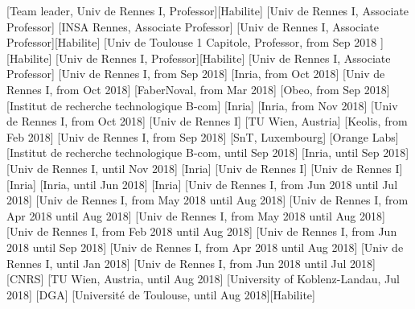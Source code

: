 \documentclass{ra2018}
\begin{document}
[Team leader, Univ de Rennes I, Professor][Habilite]
[Univ de Rennes I, Associate Professor]
[INSA Rennes, Associate Professor]
[Univ de Rennes I, Associate Professor][Habilite]
[Univ de Toulouse 1 Capitole, Professor, from Sep 2018 ][Habilite]
[Univ de Rennes I, Professor][Habilite]
[Univ de Rennes I, Associate Professor]
[Univ de Rennes I, from Sep 2018]
[Inria, from Oct 2018]
[Univ de Rennes I, from Oct 2018]
[FaberNoval, from Mar 2018]
[Obeo, from Sep 2018]
[Institut de recherche technologique B-com]
[Inria]
[Inria, from Nov 2018]
[Univ de Rennes I, from Oct 2018]
[Univ de Rennes I]
[TU Wien, Austria]
[Keolis, from Feb 2018]
[Univ de Rennes I, from Sep 2018]
[SnT, Luxembourg]
[Orange Labs]
[Institut de recherche technologique B-com, until Sep 2018]
[Inria, until Sep 2018]
[Univ de Rennes I, until Nov 2018]
[Inria]
[Univ de Rennes I]
[Univ de Rennes I]
[Inria]
[Inria, until Jun 2018]
[Inria]
[Univ de Rennes I, from Jun 2018 until Jul 2018]
[Univ de Rennes I, from May 2018 until Aug 2018]
[Univ de Rennes I, from Apr 2018 until Aug 2018]
[Univ de Rennes I, from May 2018 until Aug 2018]
[Univ de Rennes I, from Feb 2018 until Aug 2018]
[Univ de Rennes I, from Jun 2018 until Sep 2018]
[Univ de Rennes I, from Apr 2018 until Aug 2018]
[Univ de Rennes I, until Jan 2018]
[Univ de Rennes I, from Jun 2018 until Jul 2018]
[CNRS]
[TU Wien, Austria, until Aug 2018]
[University of Koblenz-Landau, Jul 2018]
[DGA]
[Université de Toulouse, until Aug 2018][Habilite]
\end{document}
